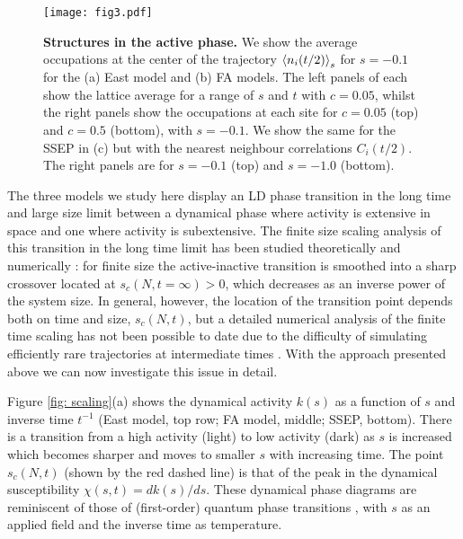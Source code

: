 \documentclass[prl,showpacs,superscriptaddress,twocolumn,longbibliography]{revtex4-1}
\newcommand{\lc}[1]{{\color{Blue}{\bf [LC: #1]}}}
\begin{document}
\begin{figure*}[t]
    \centering
    \texttt{[image: fig3.pdf]}
    \caption{\textbf{Structures in the active phase.} 
    We show the average occupations at the center of the trajectory $\braket{n_{i}(t/2)}_{s}$ for $s = -0.1$ for the (a) East model and (b) FA models.
    The left panels of each show the lattice average for a range of $s$ and $t$ with $c = 0.05$, whilst the right panels show the occupations at each site for $c = 0.05$ (top) and $c = 0.5$ (bottom), with $s = -0.1$.
    We show the same for the SSEP in (c) but with the nearest neighbour correlations $C_{i}(t/2)$. The right panels are for $s=-0.1$ (top) and $s=-1.0$ (bottom).
    \lc{Hoping to replace (a) with $N = 100$.}
    }
    \label{fig: structures}
\end{figure*}

\smallskip
{}
The three models we study here display an LD phase transition  \cite{Garrahan2007, Appert-Rolland2008, Garrahan2009, Jack2015} in the long time and large size limit between a dynamical phase where activity is extensive in space and one where activity is subextensive. The finite size scaling analysis of this transition in the long time limit has been studied theoretically \cite{Appert-Rolland2008, Bodineau2012, Bodineau2012b, Nemoto2017, Jack2020b} and numerically \cite{Nemoto2017, Banuls2019}: for finite size the active-inactive transition is smoothed into a sharp crossover located at $s_{c}(N, t=\infty)>0$, which decreases as an inverse power of the system size. In general, however, the location of the transition point depends both on time and size, $s_{c}(N, t)$, but a detailed numerical analysis of the finite time scaling has not been possible to date due to the difficulty of simulating efficiently rare trajectories at intermediate times \cite{Causer2021}. With the approach presented above we can now investigate this issue in detail.

Figure \ref{fig: scaling}(a) shows the 
dynamical activity $k(s)$ 
as a function of $s$ and inverse time $t^{-1}$ (East model, top row; FA model, middle; SSEP, bottom). There is a transition from a high activity (light) to low activity (dark) as $s$ is increased which becomes sharper and moves to smaller $s$ with increasing time. The point $s_{c}(N, t)$ (shown by the red dashed line) is that of the peak in the dynamical susceptibility $\chi(s, t) = dk(s)/ds$. These dynamical phase diagrams are reminiscent of those of (first-order) quantum phase transitions \cite{Vojta2003}, with $s$ as an applied field and the inverse time as temperature. 
\end{document}
